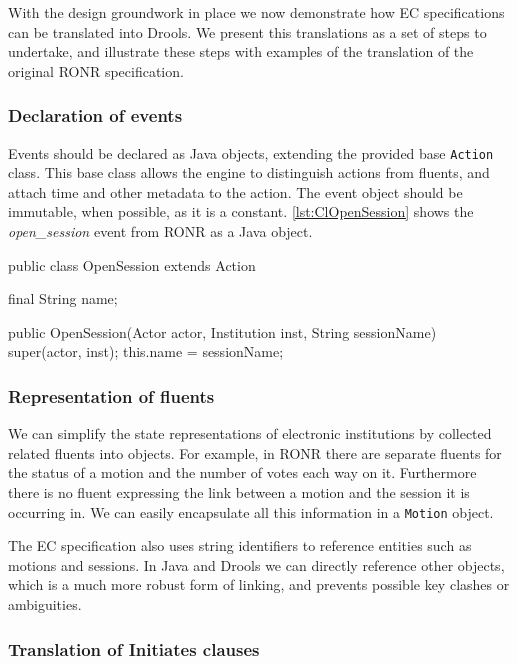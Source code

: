 With the design groundwork in place we now demonstrate how \ac{EC}
specifications can be translated into Drools. We present this translations as a
set of steps to undertake, and illustrate these steps with examples of the
translation of the original \ac{RONR} specification.

\subsubsection*{Declaration of events}

Events should be declared as Java objects, extending the provided base
\texttt{Action} class. This base class allows the engine to distinguish
actions from fluents, and attach time and other metadata to the action. The
event object should be immutable, when possible, as it is a constant. \autoref{lst:ClOpenSession}
shows the \emph{open\_session} event from \ac{RONR} as a Java object. 

\begin{java}[label=lst:ClOpenSession,caption=OpenSession action as a Java object]
public class OpenSession extends Action {

	final String name;
	
	public OpenSession(Actor actor, Institution inst, String sessionName) {
		super(actor, inst);
		this.name = sessionName;
	}
}
\end{java}

\subsubsection*{Representation of fluents}

We can simplify the state representations of electronic institutions by collected
related fluents into objects. For example, in \ac{RONR} there are separate
fluents for the status of a motion and the number of votes each way on it.
Furthermore there is no fluent expressing the link between a motion and the
session it is occurring in. We can easily encapsulate all this information in a
\texttt{Motion} object. 

The \ac{EC} specification also uses string identifiers to reference entities
such as motions and sessions. In Java and Drools we can directly reference other
objects, which is a much more robust form of linking, and prevents possible key
clashes or ambiguities.

\subsubsection*{Translation of Initiates clauses}

